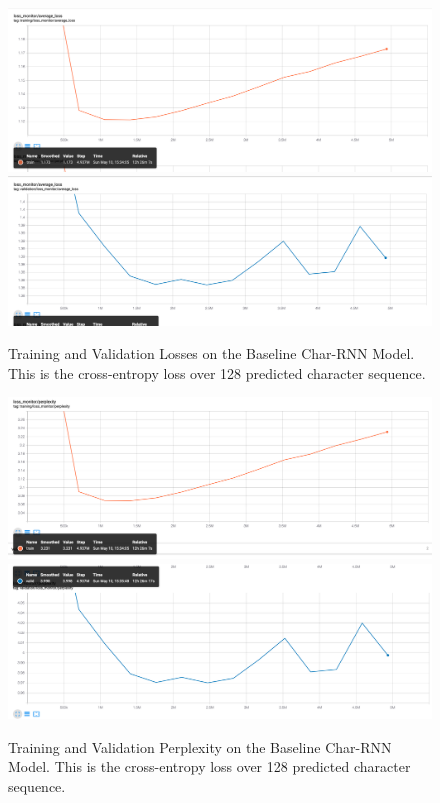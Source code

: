 \documentclass[10pt,twocolumn]{article}
\begin{document}
\begin{figure}[!ht]
    \centering
    \includegraphics[scale=0.15]{figures/char-rnn/train_loss.png}
    \includegraphics[scale=0.15]{figures/char-rnn/validation_loss.png}
    \caption{Training and Validation Losses on the Baseline Char-RNN Model. This is the cross-entropy loss over 128 predicted character sequence.}
    \label{fig:char_rnn_loss}
\end{figure}

\begin{figure}[!ht]
    \centering
    \includegraphics[scale=0.15]{figures/char-rnn/train_perplexity.png}
    \includegraphics[scale=0.15]{figures/char-rnn/validation_perplexity.png}
    \caption{Training and Validation Perplexity on the Baseline Char-RNN Model. This is the cross-entropy loss over 128 predicted character sequence.}
    \label{fig:char_rnn_perplexity}
\end{figure}
\end{document}
